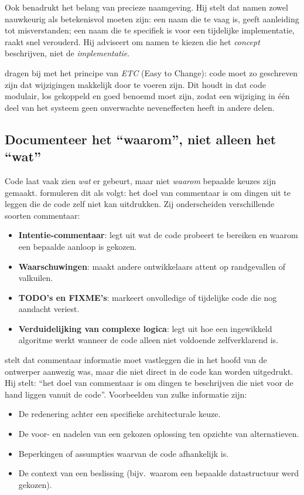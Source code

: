 Ook \textcite{ousterhout2018philosophy} benadrukt het belang van precieze naamgeving. Hij stelt dat namen zowel nauwkeurig als betekenisvol moeten zijn: een naam die te vaag is, geeft aanleiding tot misverstanden; een naam die te specifiek is voor een tijdelijke implementatie, raakt snel verouderd.
Hij adviseert om namen te kiezen die het \textit{concept} beschrijven, niet de \textit{implementatie}.

\textcite{thomas2019pragmatic} dragen bij met het principe van \textit{ETC} (Easy to Change): code moet zo geschreven zijn dat wijzigingen makkelijk door te voeren zijn.
Dit houdt in dat code modulair, los gekoppeld en goed benoemd moet zijn, zodat een wijziging in \'e\'en deel van het systeem geen onverwachte neveneffecten heeft in andere delen.

\subsection{Documenteer het ``waarom'', niet alleen het ``wat''}
Code laat vaak zien \textit{wat} er gebeurt, maar niet \textit{waarom} bepaalde keuzes zijn gemaakt.
\textcite{boswell2011readablecode} formuleren dit als volgt: het doel van commentaar is om dingen uit te leggen die de code zelf niet kan uitdrukken.
Zij onderscheiden verschillende soorten commentaar:

\begin{itemize}
\item \textbf{Intentie-commentaar}:
  legt uit wat de code probeert te bereiken en waarom een bepaalde aanloop is gekozen.
\item \textbf{Waarschuwingen}:
  maakt andere ontwikkelaars attent op randgevallen of valkuilen.
\item \textbf{TODO's en FIXME's}:
  markeert onvolledige of tijdelijke code die nog aandacht veriest.
\item \textbf{Verduidelijking van complexe logica}:
  legt uit hoe een ingewikkeld algoritme werkt wanneer de code alleen niet voldoende zelfverklarend is.
\end{itemize}

\textcite{ousterhout2018philosophy} stelt dat commentaar informatie moet vastleggen die in het hoofd van de ontwerper aanwezig was, maar die niet direct in de code kan worden uitgedrukt.
Hij stelt: ``het doel van commentaar is om dingen te beschrijven die niet voor de hand liggen vanuit de code''. Voorbeelden van zulke informatie zijn:

\begin{itemize}
\item De redenering achter een specifieke architecturale keuze.
\item De voor- en nadelen van een gekozen oplossing ten opzichte van alternatieven.
\item Beperkingen of assumpties waarvan de code afhankelijk is.
\item De context van een beslissing (bijv.\ waarom een bepaalde datastructuur werd gekozen).
\end{itemize}

